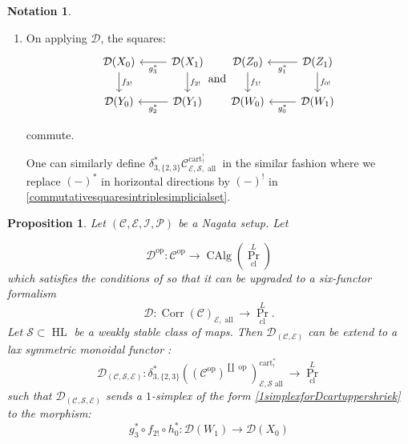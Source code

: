 \documentclass[14pt]{article}
\newtheorem{proposition}[theorem]{Proposition}
\theoremstyle{definition}
\newtheorem{notation}[theorem]{Notation}
\newcommand{\E}{\mathcal{E}}
\newcommand{\D}{\mathcal{D}}
\renewcommand{\P}{\mathcal{P}}
\newcommand{\op}[1]{\operatorname{#1}}
\renewcommand{\S}{\mathcal{S}}
\newcommand{\dd}{\delta}
\newcommand{\I}{\mathscr{I}}
\newcommand{\Ca}{\mathcal{C}}
\numberwithin{subsection}{section}
\begin{document}
\begin{notation}
\begin{enumerate}
\begin{equation}
\begin{tikzcd}
         X_0 \arrow[r,"f_3"] \arrow[d,"h_3"] & Y_0 \arrow[d,"h_2"] \\
         Z_0 \arrow[r,"f_1"] & W_0
     \end{tikzcd}
     and 
      \begin{tikzcd}
         X_1 \arrow[r,"f_2"] \arrow[d,"h_1"] & Y_1 \arrow[d,"h_0"] \\
         Z_1 \arrow[r,"f_0"] & W_1
     \end{tikzcd}
 \end{equation}
 are Cartesian. 
\item On applying $\D$, the squares:
 \begin{equation}\label{commutativesquaresintriplesimplicialset}
     \begin{tikzcd}
         \D(X_0)  \arrow[d,"f_{3!}"] & \D(X_1) \arrow[d,"f_{2!}"]\arrow[l,"g_{3}^*"] \\
         \D(Y_0)  & \D(Y_1) \arrow[l,"g_{2}^*"]
     \end{tikzcd}
     \text{and}
     \begin{tikzcd}
           \D(Z_0)\arrow[d,"f_{1!}"] & \D(Z_1) \arrow[d,"f_{0!}"]  \arrow[l,"g_{1}^*"] \\
         \D(W_0)  & \D(W_1) \arrow[l,"g_{0}^*"]
     \end{tikzcd}
 \end{equation}

 commute.

One can similarly define $\dd^*_{3,\{2,3\}}\Ca^{\op{cart}^!_!}_{\E,\S,\op{all}}$ in the similar fashion where we replace $(-)^*$ in horizontal directions by $(-)^!$ in \cref{commutativesquaresintriplesimplicialset}.
 \end{enumerate}
\end{notation}
\begin{proposition}\label{Proposition: corrextendedformalismincludingsmooth}
    Let $(\Ca,\E,\I,\P)$ be a Nagata setup. Let 

\begin{equation}
    \D^{\op{op}} : \Ca^{\op{op}} \to \op{CAlg}(\op{Pr}^{L}_{\op{cl}})
\end{equation}
which satisfies the conditions of \cite[Theorem 5.2.3]{chowdhury2025sixfunctorformalismsiiiconstruction} so that it can be upgraded to a six-functor formalism 
\begin{equation}
    \D : \op{Corr}(\Ca)_{\E,\op{all}} \to \op{Pr}^L_{\op{cl}}.
\end{equation}
Let $\S \subset \op{HL}$ be a weakly stable class of maps. 
Then $\D_{(\Ca,\E)}$ can be extend to a lax symmetric monoidal functor :
\begin{equation}
    \D_{(\Ca,\S,\E)} : \delta^*_{3,\{2,3\}}((\Ca^{\op{op}})^{\coprod\op{op}})^{\op{cart}^*_!}_{\E,\S\op{all}} \to \op{Pr}^L_{\op{cl}}
\end{equation}
 such that $\D{_(\Ca,\S,\E)}$ sends a $1$-simplex of the form \cref{1simplexforDcartuppershriek} to the morphism:
\begin{equation}
    g_3^* \circ f_{2!} \circ h_0^*: \D(W_1) \to \D(X_0) \end{equation}
\end{proposition}
\end{document}
